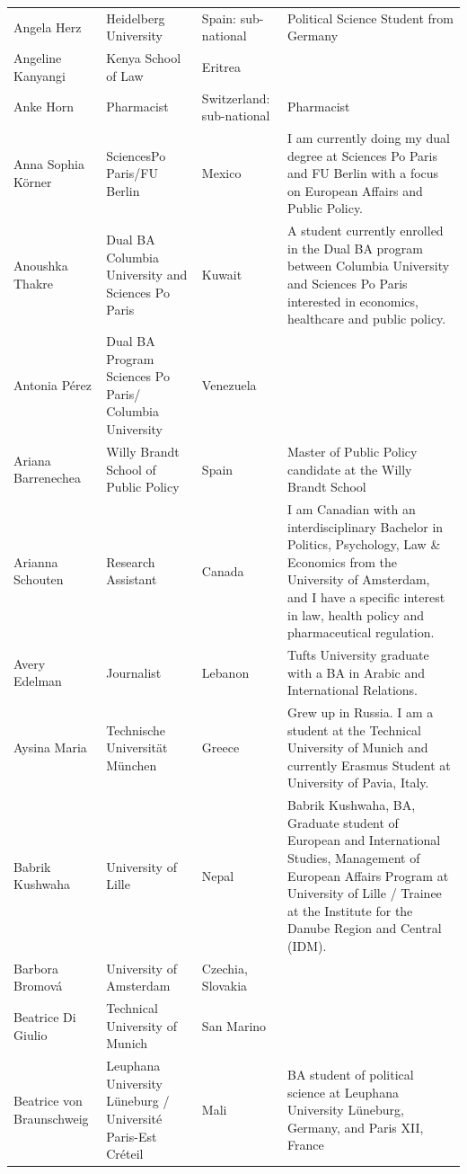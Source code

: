 \documentclass[]{article}
\begin{document}
\begin{longtable}{l>{\raggedright\arraybackslash}p{2cm}>{\raggedright\arraybackslash}p{2cm}>{\raggedright\arraybackslash}p{3cm}}
Angela Herz & Heidelberg University & Spain: sub-national & Political Science Student from Germany\\
\rowcolor{gray!6}  Angeline Kanyangi & Kenya School of Law & Eritrea & \\
\addlinespace
Anke Horn & Pharmacist & Switzerland: sub-national & Pharmacist\\
\rowcolor{gray!6}  Anna Sophia Körner & SciencesPo Paris/FU Berlin & Mexico & I am currently doing my dual degree at Sciences Po Paris and FU Berlin with a focus on European Affairs and Public Policy.\\
Anoushka Thakre & Dual BA Columbia University and Sciences Po Paris & Kuwait & A student currently enrolled in the Dual BA program between Columbia University and Sciences Po Paris interested in economics, healthcare and public policy.\\
\rowcolor{gray!6}  Antonia Pérez & Dual BA Program Sciences Po Paris/ Columbia University & Venezuela & \\
Ariana Barrenechea & Willy Brandt School of Public Policy & Spain & Master of Public Policy candidate at the Willy Brandt School\\
\addlinespace
\rowcolor{gray!6}  Arianna Schouten & Research Assistant & Canada & I am Canadian with an interdisciplinary Bachelor in Politics, Psychology, Law \& Economics from the University of Amsterdam, and I have a specific interest in law, health policy and pharmaceutical regulation.\\
Avery Edelman & Journalist & Lebanon & Tufts University graduate with a BA in Arabic and International Relations.\\
\rowcolor{gray!6}  Aysina Maria & Technische Universität München & Greece & Grew up in Russia. I am a student at the Technical University of Munich and currently Erasmus Student at University of Pavia, Italy.\\
Babrik Kushwaha & University of Lille & Nepal & Babrik Kushwaha, BA, Graduate student of European and International Studies, Management of European Affairs Program at University of Lille / Trainee at the Institute for the Danube Region and Central (IDM).\\
\rowcolor{gray!6}  Barbora Bromová & University of Amsterdam & Czechia, Slovakia & \\
\addlinespace
Beatrice Di Giulio & Technical University of Munich & San Marino & \\
\rowcolor{gray!6}  Beatrice von Braunschweig & Leuphana University Lüneburg / Université Paris-Est Créteil & Mali & BA student of political science at Leuphana University Lüneburg, Germany, and Paris XII, France\\

\end{longtable}
\end{document}
